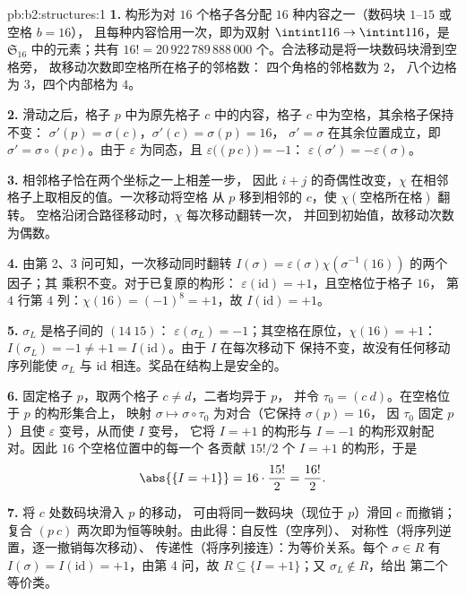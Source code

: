\begin{solution}{pb:b2:structures:1}
\textbf{1.} 构形为对 $16$ 个格子各分配
$16$ 种内容之一（数码块 $1$--$15$ 或空格 $b = 16$），
且每种内容恰用一次，即为双射 $\intint1{16} \to
\intint1{16}$，是 $\mathfrak{S}_{16}$ 中的元素；共有 $16!
= 20\,922\,789\,888\,000$ 个。合法移动是将一块数码块滑到空格旁，
故移动次数即空格所在格子的邻格数：
四个角格的邻格数为 $2$，
八个边格为 $3$，四个内部格为 $4$。

\textbf{2.} 滑动之后，格子 $p$ 中为原先格子
$c$ 中的内容，格子 $c$ 中为空格，其余格子保持不变：
$\sigma'(p) = \sigma(c)$，$\sigma'(c) = \sigma(p) = 16$，
$\sigma' = \sigma$ 在其余位置成立，即 $\sigma' = \sigma
\circ (p\ c)$。由于 $\varepsilon$ 为同态，且
$\varepsilon\bigl((p\ c)\bigr) = -1$：
$\varepsilon(\sigma') = -\varepsilon(\sigma)$。

\textbf{3.} 相邻格子恰在两个坐标之一上相差一步，
因此 $i + j$ 的奇偶性改变，$\chi$
在相邻格子上取相反的值。一次移动将空格
从 $p$ 移到相邻的 $c$，使 $\chi(\text{空格所在格})$ 翻转。
空格沿闭合路径移动时，$\chi$ 每次移动翻转一次，
并回到初始值，故移动次数为偶数。

\textbf{4.} 由第 2、3 问可知，一次移动同时翻转
$I(\sigma) = \varepsilon(\sigma)\chi(\sigma^{-1}(16))$ 的两个因子；其
乘积不变。对于已复原的构形：
$\varepsilon(\mathrm{id}) = +1$，且空格位于格子 $16$，
第 $4$ 行第 $4$ 列：$\chi(16) = (-1)^{8} = +1$，故
$I(\mathrm{id}) = +1$。

\textbf{5.} $\sigma_L$ 是格子间的 $(14\ 15)$：
$\varepsilon(\sigma_L) = -1$；其空格在原位，$\chi(16) = +1$：
$I(\sigma_L) = -1 \neq +1 = I(\mathrm{id})$。由于 $I$ 在每次移动下
保持不变，故没有任何移动序列能使 $\sigma_L$
与 $\mathrm{id}$ 相连。奖品在结构上是安全的。

\textbf{6.} 固定格子 $p$，取两个格子 $c \neq d$，二者均异于 $p$，
并令 $\tau_0 = (c\ d)$。在空格位于 $p$ 的构形集合上，
映射 $\sigma \mapsto \sigma
\circ \tau_0$ 为对合（它保持 $\sigma(p) = 16$，
因 $\tau_0$ 固定 $p$）且使 $\varepsilon$ 变号，从而使 $I$ 变号，
它将 $I = +1$ 的构形与
$I = -1$ 的构形双射配对。因此 $16$ 个空格位置中的每一个
各贡献 $15!/2$ 个 $I = +1$ 的构形，于是
\[
\abs{\{I = +1\}} = 16 \cdot \frac{15!}{2} = \frac{16!}{2}.
\]

\textbf{7.} 将 $c$ 处数码块滑入 $p$ 的移动，
可由将同一数码块（现位于 $p$）滑回 $c$ 而撤销；复合
$(p\ c)$ 两次即为恒等映射。由此得：自反性（空序列）、
对称性（将序列逆置，逐一撤销每次移动）、
传递性（将序列接连）：为等价关系。每个
$\sigma \in R$ 有 $I(\sigma) = I(\mathrm{id}) = +1$，由第 
4 问，故 $R \subseteq \{I = +1\}$；又 $\sigma_L \notin R$，给出
第二个等价类。


\end{solution}
